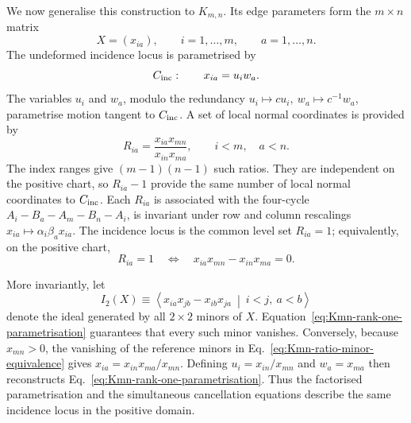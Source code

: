 \documentclass[a4paper,11pt]{article}
\begin{document}
We now generalise this construction to \(K_{m,n}\).  Its edge parameters form
the \(m\times n\) matrix
\begin{equation}
 X=(x_{ia}),\qquad i=1,\ldots,m,\qquad a=1,\ldots,n.
 \label{eq:Kmn-edge-matrix}
\end{equation}
The undeformed incidence locus is parametrised by
\begin{equation}
 C_{\rm inc}:\qquad x_{ia}=u_iw_a .
 \label{eq:Kmn-rank-one-parametrisation}
\end{equation}
The variables \(u_i\) and \(w_a\), modulo the redundancy
\(u_i\mapsto c u_i,\ w_a\mapsto c^{-1}w_a\), parametrise motion tangent to
\(C_{\rm inc}\).  A set of local normal coordinates is provided by
\begin{equation}
 R_{ia}=\frac{x_{ia}x_{mn}}{x_{in}x_{ma}},
 \qquad i<m,\quad a<n.
 \label{eq:Kmn-cycle-ratios}
\end{equation}
The index ranges give \((m-1)(n-1)\) such ratios.  They are independent on
the positive chart, so \(R_{ia}-1\) provide the same number of local normal
coordinates to \(C_{\rm inc}\).
Each \(R_{ia}\) is associated with the four-cycle
\(A_i-B_a-A_m-B_n-A_i\), is invariant under row and column rescalings
\(x_{ia}\mapsto\alpha_i\beta_a x_{ia}\).  The incidence locus is the common
level set \(R_{ia}=1\); equivalently, on the positive chart,
\begin{equation}
 R_{ia}=1
 \quad\Longleftrightarrow\quad
 x_{ia}x_{mn}-x_{in}x_{ma}=0.
 \label{eq:Kmn-ratio-minor-equivalence}
\end{equation}

More invariantly, let
\begin{equation}
 I_2(X)\equiv
 \left\langle
 x_{ia}x_{jb}-x_{ib}x_{ja}
 \ \middle|\ i<j,\ a<b
 \right\rangle
 \label{eq:Kmn-determinantal-ideal}
\end{equation}
denote the ideal generated by all \(2\times2\) minors of \(X\).
Equation~\eqref{eq:Kmn-rank-one-parametrisation} guarantees that every such
minor vanishes.  Conversely, because \(x_{mn}>0\), the vanishing of the
reference minors in Eq.~\eqref{eq:Kmn-ratio-minor-equivalence} gives
\(x_{ia}=x_{in}x_{ma}/x_{mn}\).  Defining
\(u_i=x_{in}/x_{mn}\) and \(w_a=x_{ma}\) then reconstructs
Eq.~\eqref{eq:Kmn-rank-one-parametrisation}.  Thus the factorised
parametrisation and the simultaneous cancellation equations describe the
same incidence locus in the positive domain.
\end{document}
